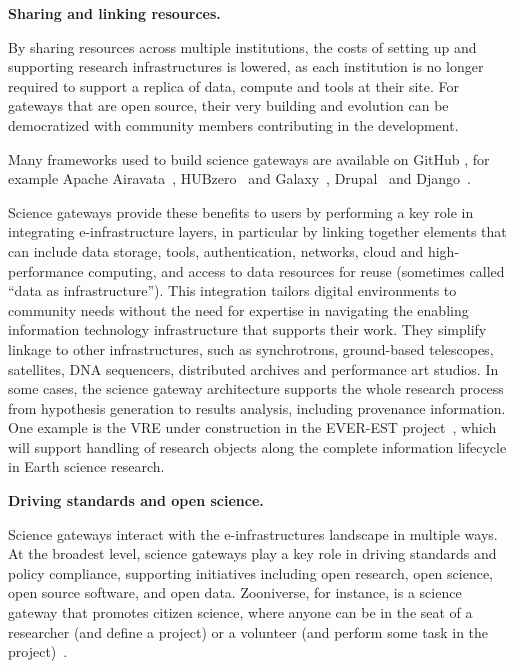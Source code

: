 \documentclass[review]{elsarticle}
\newcommand{\changedtext}[1]{
	{#1}
}
\begin{document}
\changedtext{\textbf{Sharing and linking resources.} }
By sharing resources across multiple institutions, the costs of setting up and supporting research infrastructures is lowered, as each institution is no longer required to support a replica of data, compute and tools at their site. For gateways that are open source, their very building and evolution can be democratized with community members contributing in the development. 
\changedtext{Many frameworks used to build  science gateways are available on GitHub}, for example Apache Airavata~\cite{airavata}, HUBzero~\cite{hubzero-55} and  Galaxy~\cite{galaxy}, Drupal~\cite{drupal} and Django~\cite{django}.

Science gateways provide these benefits to users by performing a key role in integrating e-infrastructure layers, in particular by linking together elements that can include data storage, tools, authentication, networks, cloud and high-performance computing, and access to data resources for reuse (sometimes called ``data as infrastructure''). This integration tailors digital environments to community needs without the need for expertise in navigating the enabling information technology infrastructure that supports their work. They simplify linkage to other infrastructures, such as synchrotrons, ground-based telescopes, satellites, DNA sequencers, distributed archives and performance art studios. In some cases, the science gateway architecture supports the whole research process from hypothesis generation to results analysis, including provenance information. One example is the VRE under construction in the EVER-EST project~\cite{everest-73}, which will support handling of research objects along the complete information lifecycle in Earth science research. 

\changedtext{\textbf{Driving standards and open science.}}
Science gateways interact with the e-infrastructures landscape in multiple ways. At the broadest level, science gateways play a key role in driving standards and policy compliance, supporting initiatives including open research, open science, open source software, and open data.  Zooniverse, for instance, is a science gateway that promotes  citizen science, where anyone can be in the seat of a researcher (and define a project) or a volunteer (and perform some task in the project)~\cite{zoo-76}. 
\end{document}
